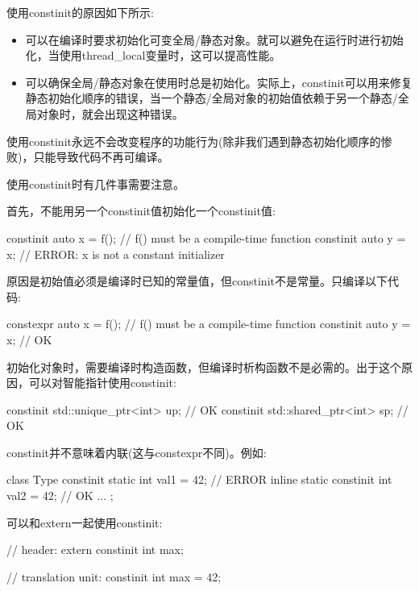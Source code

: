 使用constinit的原因如下所示:

\begin{itemize}
\item
可以在编译时要求初始化可变全局/静态对象。就可以避免在运行时进行初始化，当使用thread\_local变量时，这可以提高性能。

\item
可以确保全局/静态对象在使用时总是初始化。实际上，constinit可以用来修复静态初始化顺序的错误，当一个静态/全局对象的初始值依赖于另一个静态/全局对象时，就会出现这种错误。
\end{itemize}

使用constinit永远不会改变程序的功能行为(除非我们遇到静态初始化顺序的惨败)，只能导致代码不再可编译。


使用constinit时有几件事需要注意。

首先，不能用另一个constinit值初始化一个constinit值:

\begin{cpp}
constinit auto x = f(); // f() must be a compile-time function
constinit auto y = x; // ERROR: x is not a constant initializer
\end{cpp}

原因是初始值必须是编译时已知的常量值，但constinit不是常量。只编译以下代码:

\begin{cpp}
constexpr auto x = f(); // f() must be a compile-time function
constinit auto y = x; // OK
\end{cpp}

初始化对象时，需要编译时构造函数，但编译时析构函数不是必需的。出于这个原因，可以对智能指针使用constinit:

\begin{cpp}
constinit std::unique_ptr<int> up; // OK
constinit std::shared_ptr<int> sp; // OK
\end{cpp}

constinit并不意味着内联(这与constexpr不同)。例如:

\begin{cpp}
class Type {
	constinit static int val1 = 42; // ERROR
	inline static constinit int val2 = 42; // OK
	...
};
\end{cpp}

可以和extern一起使用constinit:

\begin{cpp}
// header:
extern constinit int max;

// translation unit:
constinit int max = 42;
\end{cpp}

